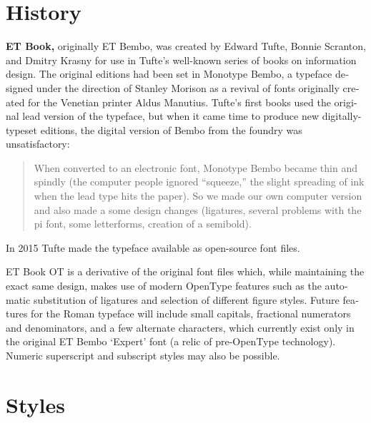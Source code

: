 \documentclass{scrartcl}
\begin{document}
\begin{english}
\clearpage

\section{History}

\textbf{ET Book,} originally {\semibold ET Bembo,} was created by Edward Tufte, Bonnie Scranton, and Dmitry Krasny for use in Tufte’s well-known series of books on information design. The original editions had been set in Monotype Bembo, a typeface designed under the direction of Stanley Morison as a revival of fonts originally created for the Venetian printer Aldus Manutius. Tufte’s first books used the original lead version of the typeface, but when it came time to produce new digitally-typeset editions, the digital version of Bembo from the foundry was unsatisfactory:

\begin{quote}
When converted to an electronic font, Monotype Bembo became thin and spindly (the computer people ignored “squeeze,” the slight spreading of ink when the lead type hits the paper). So we made our own computer version and also made a some design changes (ligatures, several problems with the pi font, some letterforms, creation of a semibold).
\end{quote}

In 2015 Tufte made the typeface available as open-source font files.

ET Book OT is a derivative of the original font files which, while maintaining the exact same design, makes use of modern OpenType features such as the automatic substitution of ligatures and selection of different figure styles. Future features for the Roman typeface will include small capitals, fractional numerators and denominators, and a few alternate characters, which currently exist only in the original ET Bembo ‘Expert’ font (a relic of pre-OpenType technology). Numeric superscript and subscript styles may also be possible.

\clearpage
\section{Styles}

{
\setlength{\parskip}{1em}
\setlength{\parindent}{0pt}

\newenvironment{style}[1]{\begin{minipage}[t]{6em}#1\end{minipage}\begin{minipage}[t]{30em}\bgroup\Large\setlength{\parskip}{0.6666em}}{\egroup\end{minipage}}

}
\end{english}
\end{document}
